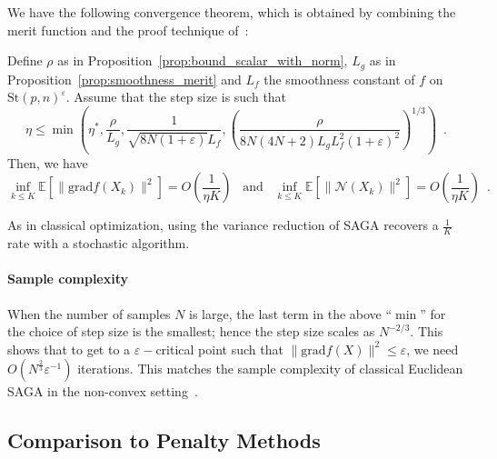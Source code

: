 \documentclass[twoside,11pt]{article}
\newcommand{\grad}{{\mathrm{grad}}}
\newcommand{\stiefel}{{\mathrm{St}(p, n)}}
\begin{document}
We have the following convergence theorem, which is obtained by combining the merit function and the proof technique of~\citet{reddi2016fast}:
\begin{proposition}
\label{prop:convergence_saga}
  Define $\rho$ as in Proposition~\ref{prop:bound_scalar_with_norm}, $L_g$ as in Proposition~\ref{prop:smoothness_merit} and $L_f$ the smoothness constant of $f$ on $\stiefel^\varepsilon$. Assume that the step size is such that  
  $$\eta\leq \min\left(\eta^*, \frac{\rho}{L_g}, \frac1{\sqrt{8N(1+\varepsilon)}L_f}, \left(\frac \rho{8N(4N+2)L_gL_f^2(1+\varepsilon)^2}\right)^{1/3}\right)\enspace.$$
  Then, we have 
  $$
  \inf_{k\leq K}\mathbb{E}[\|\grad f(X_k)\|^2] =O\left(\frac{1}{\eta K}\right)\enspace \text{ and } \enspace \inf_{k\leq K}\mathbb{E}[\|\mathcal{N}(X_k)\|^2] =O\left(\frac{1}{\eta K}\right)\enspace .
  $$
\end{proposition}
%
%
%
%
%
%
%
%
%
%
%
%
%
%
%
%
%
%
%
%
%
%
%
%
%
%
%

%
%
%
%
%
%
%
%
%
%
%
%

%
%
%
%
%
%
%
%
%
%
%
%
%
%
%
%
%
%
%
%
%
%
%
%

%

%
%
%
%
%
%
%
%
%
%

%
%
%
%
%
%
%
%
%
%
As in classical optimization, using the variance reduction of SAGA recovers a $\frac1K$ rate with a stochastic algorithm.
%


\paragraph{Sample complexity}
When the number of samples $N$ is large, the last term in the above ``$\min$'' for the choice of step size is the smallest; hence the step size scales as $N^{-2/3}$. This shows that to get to a $\varepsilon-$critical point such that $\|\grad f(X)\|^2\leq\varepsilon$, we need $O(N^{\frac23}\varepsilon^{-1})$ iterations. 
This matches the sample complexity of classical Euclidean SAGA in the non-convex setting~\citep{reddi2016fast}.

%

\subsection{Comparison to Penalty Methods}
\label{sec:penalty}
\end{document}
